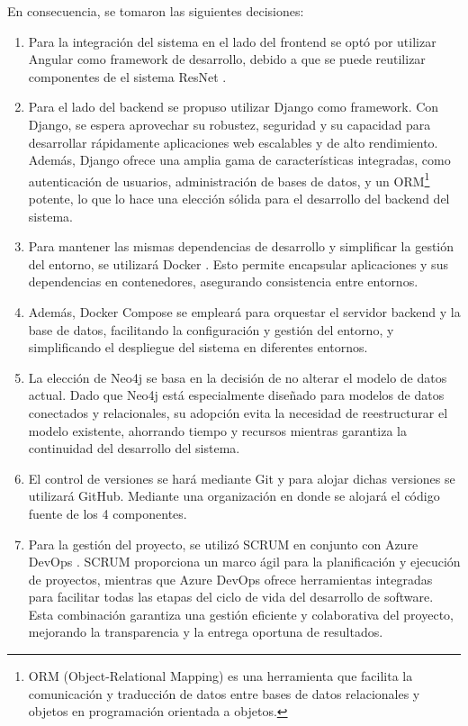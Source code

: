 \begin{itemize}
    En consecuencia, se tomaron las siguientes decisiones:
    \begin{enumerate}
        \item Para la integración del sistema  en el lado del frontend se optó por utilizar Angular como framework de desarrollo, debido a que se puede reutilizar componentes de el sistema ResNet \cite{RESNET}. 
        \item Para el lado del backend se propuso utilizar Django como framework. Con Django, se espera aprovechar su robustez, seguridad y su capacidad para desarrollar rápidamente aplicaciones web escalables y de alto rendimiento. Además, Django ofrece una amplia gama de características integradas, como autenticación de usuarios, administración de bases de datos, y un ORM\footnote{ORM (Object-Relational Mapping) es una herramienta que facilita la comunicación y traducción de datos entre bases de datos relacionales y objetos en programación orientada a objetos.} potente, lo que lo hace una elección sólida para el desarrollo del backend del sistema. 
        \item Para mantener las mismas dependencias de desarrollo y simplificar la gestión del entorno, se utilizará Docker \cite{DOCKER}. Esto permite encapsular aplicaciones y sus dependencias en contenedores, asegurando consistencia entre entornos.
        \item Además, Docker Compose se empleará para orquestar el servidor backend y la base de datos, facilitando la configuración y gestión del entorno, y simplificando el despliegue del sistema en diferentes entornos.
        \item La elección de Neo4j se basa en la decisión de no alterar el modelo de datos actual. Dado que Neo4j está especialmente diseñado para modelos de datos conectados y relacionales, su adopción evita la necesidad de reestructurar el modelo existente, ahorrando tiempo y recursos mientras garantiza la continuidad del desarrollo del sistema.
        \item El control de versiones se hará mediante Git y para alojar dichas versiones se utilizará GitHub. Mediante una organización en donde se alojará el código fuente de los 4 componentes.
        \item Para la gestión del proyecto, se utilizó SCRUM en conjunto con Azure DevOps \cite{AZURE-DEVOPS}. SCRUM proporciona un marco ágil para la planificación y ejecución de proyectos, mientras que Azure DevOps \cite{AZURE-DEVOPS} ofrece herramientas integradas para facilitar todas las etapas del ciclo de vida del desarrollo de software. Esta combinación garantiza una gestión eficiente y colaborativa del proyecto, mejorando la transparencia y la entrega oportuna de resultados.

\end{enumerate}
\end{itemize}
